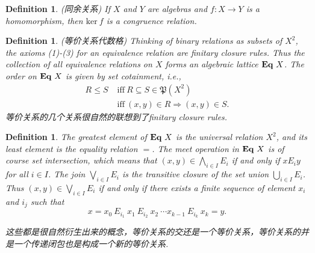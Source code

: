 \documentclass{article}
\newtheorem{definition}[theorem]{Definition}
\newcommand*{\xfunc}[4]{{#2}\colon{#3}{#1}{#4}}
\newcommand*{\func}[3]{\xfunc{\to}{#1}{#2}{#3}}
\newcommand\eql[1]{\ensuremath\mathbf{Eq}~{#1}}
\begin{document}
\begin{definition}
\rm {\color{red}(同余关系)} If $X$ and $Y$ are algebras and $\func{f}{X}{Y}$ is a homomorphism, then $\text{ker}~f$ is a {\color{red} congruence relation}.
\end{definition}

\begin{definition}
\rm {\color{red}(等价关系代数格)} Thinking of binary relations as subsets of $X^2$, the axioms (1)-(3) for an equivalence relation are finitary closure rules. Thus the collection of all equivalence relations on $X$ forms an algebraic lattice $\eql{X}$. The order on $\eql{X}$ is given by set cotainment, i.e.,
$$
\begin{aligned}
R \leq S\;& \text{iff}~R \subseteq S \in \mathfrak{P}(X^2)\\
& \text{iff}~(x,y) \in R \Rightarrow (x,y) \in S.
\end{aligned}
$$
{\color{blue} 等价关系的几个关系很自然的联想到了finitary closure rules}.
\end{definition}

\begin{definition}
\rm The greatest element of $\eql{X}$ is the universal relation $X^2$, and its least element is the equality relation $=$. The meet operation in $\eql{X}$ is of course set intersection, which means that $(x,y) \in \bigwedge\limits_{i \in I} E_i$ if and only if $x E_i y$ for all $i \in I$. The join $\bigvee\limits_{i \in I} E_i$ is the transitive closure of the set union $\bigcup\limits_{i \in I} E_i$. Thus $(x,y) \in \bigvee\limits_{i \in I} E_i$ if and only if there exists a finite sequence of element $x_i$ and $i_j$ such that 
$$
x = x_0~E_{i_1}~x_1~E_{i_2}~x_2~\cdots x_{k-1}~E_{i_k}~x_k = y.
$$

{\color{blue} 这些都是很自然衍生出来的概念，等价关系的交还是一个等价关系，等价关系的并是一个传递闭包也是构成一个新的等价关系}.
\end{definition}
\end{document}

